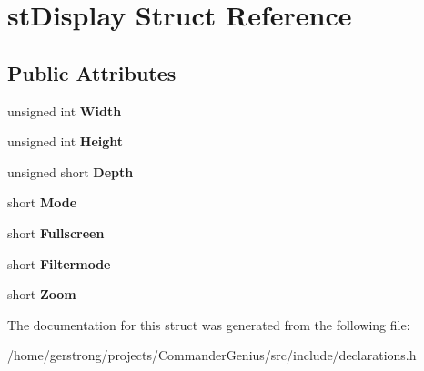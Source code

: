 \hypertarget{structst_display}{
\section{stDisplay Struct Reference}
\label{structst_display}
}
\subsection*{Public Attributes}
\begin{DoxyCompactItemize}
\item 
\hypertarget{structst_display_ad25fa060c1a694243066005081401434}{
unsigned int {\bfseries Width}}
\label{structst_display_ad25fa060c1a694243066005081401434}

\item 
\hypertarget{structst_display_af54592b5e056c02680150a0fd539b9cc}{
unsigned int {\bfseries Height}}
\label{structst_display_af54592b5e056c02680150a0fd539b9cc}

\item 
\hypertarget{structst_display_a3b62b0aeac6c3c0b18cc44b54eae720e}{
unsigned short {\bfseries Depth}}
\label{structst_display_a3b62b0aeac6c3c0b18cc44b54eae720e}

\item 
\hypertarget{structst_display_ae86334792a1e652e96e19b267e996f37}{
short {\bfseries Mode}}
\label{structst_display_ae86334792a1e652e96e19b267e996f37}

\item 
\hypertarget{structst_display_a9a157b748173fd52c0761ae85ebd3170}{
short {\bfseries Fullscreen}}
\label{structst_display_a9a157b748173fd52c0761ae85ebd3170}

\item 
\hypertarget{structst_display_a2a63645e08524d4ae07ca88fc08f0dd5}{
short {\bfseries Filtermode}}
\label{structst_display_a2a63645e08524d4ae07ca88fc08f0dd5}

\item 
\hypertarget{structst_display_a95f5b4adc180ae5c89dc7bda8c0cc891}{
short {\bfseries Zoom}}
\label{structst_display_a95f5b4adc180ae5c89dc7bda8c0cc891}

\end{DoxyCompactItemize}


The documentation for this struct was generated from the following file:\begin{DoxyCompactItemize}
\item 
/home/gerstrong/projects/CommanderGenius/src/include/declarations.h\end{DoxyCompactItemize}
